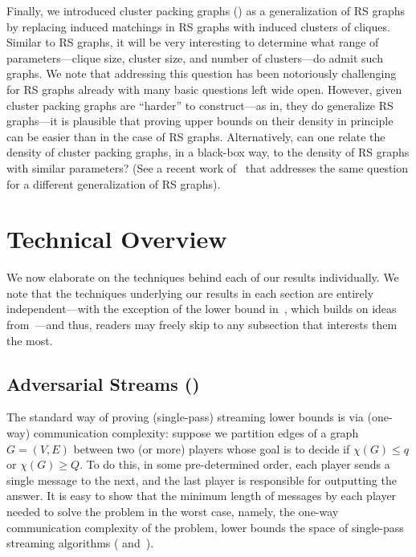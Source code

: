 \documentclass[11pt]{article}
\theoremstyle{definition}
\renewcommand{\leq}{\leqslant}
\renewcommand{\geq}{\geqslant}
\begin{document}
Finally, we introduced cluster packing graphs () as a generalization of RS graphs by replacing induced matchings in RS graphs with induced clusters of cliques. Similar to RS graphs, it will be very interesting 
to determine what range of parameters---clique size, cluster size, and number of clusters---do admit such graphs. We note that addressing this question has been notoriously challenging for RS graphs already with many basic questions 
left wide open. However, given cluster packing graphs are ``harder'' to construct---as in, they do generalize RS graphs---it is plausible that proving upper bounds on their density in principle can be easier than in the case of RS graphs. 
Alternatively, can one relate the density of cluster packing graphs, in a black-box way, to the density of RS graphs with similar parameters? (See a recent work of~\cite{Pratt25} that addresses the same question for a different generalization
of RS graphs). 
 

\clearpage

\section{Technical Overview}\label{sec:techniques}

We now elaborate on the techniques behind each of our results individually. We note that the techniques underlying our results in each section are entirely independent---with the exception of the lower bound in~, which builds on ideas from~---and thus, readers may freely skip to any subsection that interests them the most.


\subsection{Adversarial Streams ()}\label{sec:over-adv}

The standard way of proving (single-pass) streaming lower bounds is via (one-way) communication complexity: suppose we partition edges of a graph $G=(V,E)$ between two (or more) players whose goal is to decide if $\chi(G) \leq q$ or $\chi(G) \geq Q$. 
To do this, in some pre-determined order, each player sends a single message to the next, and the last player is responsible for outputting the answer. It is easy to show that the minimum length of messages by each player needed to solve the problem in the worst case, namely, the one-way communication complexity of the problem, lower bounds the space of single-pass streaming algorithms ( and~). 
\end{document}
